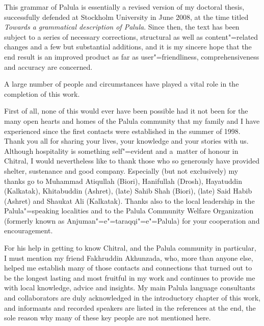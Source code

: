 \begin{refsection}

This grammar of Palula is essentially a revised version of my doctoral thesis, successfully defended at Stockholm University in June 2008, at the time titled \textit{Towards a grammatical description of Palula}. Since then, the text has been subject to a series of necessary corrections, structural as well as content"=related changes and a few but substantial additions, and it is my sincere hope that the end result is an improved product as far as user"=friendliness, comprehensiveness and accuracy are concerned.


A large number of people and circumstances have played a vital role in the completion of this work.


First of all, none of this would ever have been possible had it not been for the many open hearts and homes of the Palula community that my family and I have experienced since the first contacts were established in the summer of 1998. Thank you all for sharing your lives, your knowledge and your stories with us. Although hospitality is something self"=evident and a~matter of honour in Chitral, I would nevertheless like to thank those who so generously have provided shelter, sustenance and good company. Especially (but not exclusively) my thanks go to Muhammad Atiqullah (Biori), Hanifullah (Drosh), Hayatuddin (Kalkatak), Khitabuddin (Ashret), (late) Sahib Shah (Biori), (late) Said Habib (Ashret) and Shaukat Ali (Kalkatak). Thanks also to the local leadership in the Palula"=speaking localities and to the Palula Community Welfare Organization (formerly known as Anjuman"=e"=taraqqi"=e"=Palula) for your cooperation and encouragement. 


For his help in getting to know Chitral, and the Palula community in particular, I must mention my friend Fakhruddin Akhunzada, who, more than anyone else, helped me establish many of those contacts and connections that turned out to be the longest lasting and most fruitful in my work and continues to provide me with local knowledge, advice and insights. My main Palula language consultants and collaborators are duly acknowledged in the introductory chapter of this work, and informants and recorded speakers are listed in the references at the end, the sole reason why many of these key people are not mentioned here.



\end{refsection}
